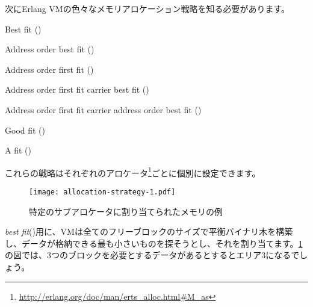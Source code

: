 次にErlang VMの色々なメモリアロケーション戦略を知る必要があります。

\begin{enumerate*}
    \item Best fit ()
    \item Address order best fit ()
    \item Address order first fit ()
    \item Address order first fit carrier best fit ()
    \item Address order first fit carrier address order best fit ()
    \item Good fit ()
    \item A fit ()
\end{enumerate*}

これらの戦略はそれぞれのアロケータ\footnote{\href{http://erlang.org/doc/man/erts\_alloc.html\#M\_as}{http://erlang.org/doc/man/erts\_alloc.html\#M\_as}}ごとに個別に設定できます。

\begin{figure}
  \texttt{[image: allocation-strategy-1.pdf]}%
  \centering%
  \caption{特定のサブアロケータに割り当てられたメモリの例}%
   \label{fig:allocation-strategy-1}
\end{figure}
\FloatBarrier

\emph{best fit}()用に、VMは全てのフリーブロックのサイズで平衡バイナリ木を構築し、データが格納できる最も小さいものを探そうとし、それを割り当てます。\ref{fig:allocation-strategy-1}の図では、3つのブロックを必要とするデータがあるとするとエリア3になるでしょう。

